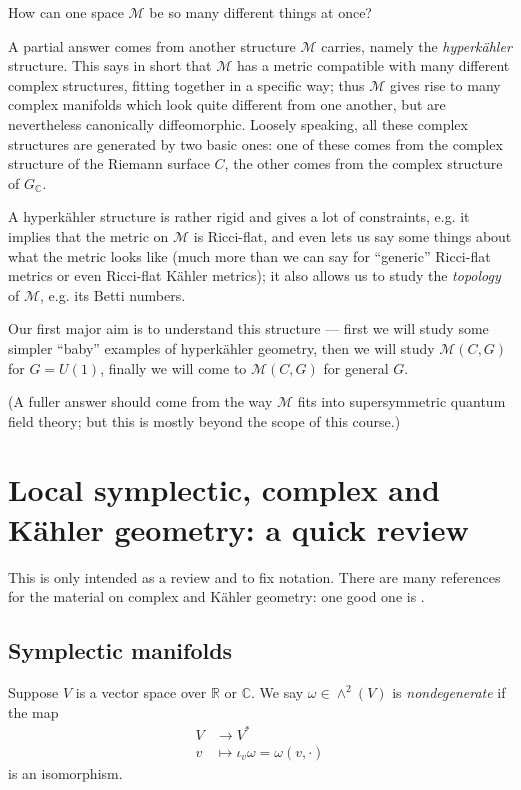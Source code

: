 \documentclass[12pt,letterpaper,reqno]{article}
\numberwithin{equation}{section}
\newcommand{\cM}{\ensuremath{\mathcal M}}
\newcommand{\R}{\ensuremath{\mathbb R}}
\newcommand{\C}{\ensuremath{\mathbb C}}
\newcommand{\kahler}{K\"ahler\xspace}
\newcommand{\hk}{hyperk\"ahler\xspace}
\newcommand{\ti}[1]{\textit{#1}}
\newcommand{\fixme}[1]{{\color{blue}{[#1]}}}
\begin{document}
How can one space $\cM$ be so many different things at once?

A partial answer comes from another structure $\cM$ carries, namely
the \ti{\hk} structure. This says in short that $\cM$ has a 
metric compatible with many
different complex structures,
fitting together in a specific way; thus $\cM$ gives rise to
many complex manifolds which look quite different from one
another, but are nevertheless canonically diffeomorphic.
Loosely speaking, all these complex structures are generated 
by two basic ones: one of these comes from the complex structure
of the Riemann surface $C$, the other comes from the complex
structure of $G_\C$.

A \hk structure is rather rigid and gives a lot of constraints, e.g.
it implies that the metric on $\cM$ is Ricci-flat, and even lets 
us say some things about what the metric looks like (much
more than we can say for ``generic'' Ricci-flat metrics
or even Ricci-flat \kahler metrics);
it also allows us to study the \ti{topology} of $\cM$, e.g. 
its Betti numbers.

Our first major aim is to understand this structure --- first 
we will study some simpler ``baby'' examples of \hk geometry, then
we will study $\cM(C,G)$ for $G = U(1)$, finally we will
come to $\cM(C,G)$ for general $G$.

(A fuller answer should come from the way $\cM$
fits into supersymmetric quantum field theory; but this is 
mostly beyond the scope of this course.)


\section{Local symplectic, complex and \kahler geometry: a quick review}

This is only intended as a review and to fix notation.
There are many references for the material on complex
and \kahler geometry: one
good one is \cite{MR2093043}.


\subsection{Symplectic manifolds}

\fixme{should put some references here?}

\begin{defn}
Suppose $V$ is a vector space over $\R$ or $\C$.
We say $\omega \in \wedge^2(V)$ is \ti{nondegenerate}
if the map
\begin{align}
  V &\to V^* \\
  v &\mapsto \iota_v \omega = \omega(v,\cdot)
\end{align}
is an isomorphism.
\end{defn}
\end{document}
